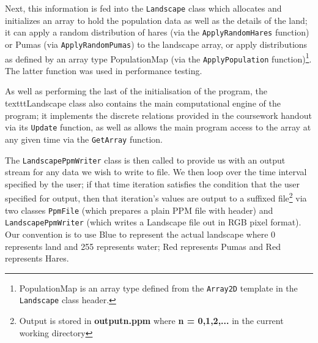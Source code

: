 Next, this information is fed into the \texttt{Landscape} class which allocates and initializes an array to hold the population data as well as the details of the land; it can apply a random distribution of hares (via the \texttt{ApplyRandomHares} function) or Pumas (via \texttt{ApplyRandomPumas}) to the landscape array, or apply distributions as defined by an array type PopulationMap (via the \texttt{ApplyPopulation} function)\footnote{PopulationMap is an array type defined from the \texttt{Array2D} template in the \texttt{Landscape} class header.}. The latter function was used in performance testing.

As well as performing the last of the initialisation of the program, the texttt{Landscape} class also contains the main computational engine of the program; it implements the discrete relations provided in the coursework handout via its \texttt{Update} function, as well as allows the main program access to the array at any given time via the \texttt{GetArray} function.

The \texttt{LandscapePpmWriter} class is then called to provide us with an output stream for any data we wish to write to file. We then loop over the time interval specified by the user; if that time iteration satisfies the condition that the user specified for output, then that iteration's values are output to a suffixed file\footnote{Output is stored in \textbf{outputn.ppm} where \textbf{n = 0,1,2,...} in the current working directory} via two classes \texttt{PpmFile} (which prepares a plain PPM file with header) and \texttt{LandscapePpmWriter} (which writes a Landscape file out in RGB pixel format). Our convention is to use Blue to represent the actual landscape where 0 represents land and 255 represents water; Red represents Pumas and Red represents Hares.

